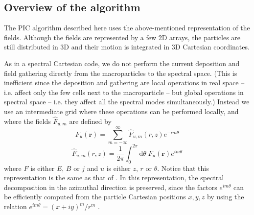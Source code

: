\documentclass[1p,times,authoryear]{elsarticle}
\newcommand{\TInteg}[1]{\int_{0}^{2\pi} \!\!\!\!\!\! \mathrm{d}#1}
\renewcommand{\vec}[1]{\boldsymbol{#1}}
\begin{document}
\subsection{Overview of the algorithm}

The PIC algorithm described here uses the above-mentioned representation
of the fields. Although the fields are represented by a few
2D arrays, the particles are still distributed in 3D and their motion
is integrated in 3D Cartesian coordinates. 

As in a spectral Cartesian code, we do not perform the
current deposition and field gathering directly from the
macroparticles to the spectral space. (This is inefficient since the
deposition and gathering are local operations in real space -- i.e. affect
only the few cells next to the macroparticle -- but global operations
in spectral space -- i.e. they affect all the spectral modes
simultaneously.) Instead we use an intermediate grid where these
operations can be performed locally, and where the fields $\hat{F}_{u,m}$
are defined by
\begin{equation} 
\label{eq:IntermBwTrans}
F_u(\vec{r}) = \sum_{m=-\infty}^{\infty} \hat{F}_{u,m}(r,z)
e^{-im\theta} 
\end{equation}
\begin{equation}
\label{eq:IntermFwTrans}
\hat{F}_{u,m}(r,z) = \frac{1}{2\pi} \TInteg{\theta} \;
F_u(\vec{r})e^{im\theta}
\end{equation}
where ${F}$ is either ${E}$, ${B}$ or
${j}$ and $u$ is either $z$, $r$ or $\theta$. Notice that this representation is the
same as that of \citep{Lifschitz, Davidson}. In this
representation, the spectral decomposition in the azimuthal
direction is preserved, since the factors $e^{im\theta}$ can be efficiently computed from the
particle Cartesian positions $x,y,z$ by using the relation $e^{im\theta} = (x+iy)^m/r^m$
\citep{Lifschitz}.
\end{document}
